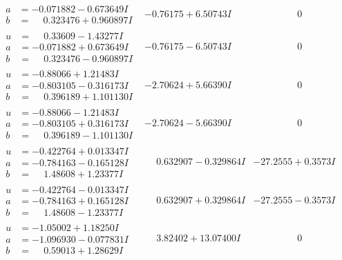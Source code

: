 \documentclass[1p]{elsarticle_modified}
\theoremstyle{definition}
\begin{document}
$$\begin{array}{c|c|c}
\begin{aligned}
a &= -0.071882 - 0.673649 I \\
b &= \phantom{-}0.323476 + 0.960897 I\end{aligned}
 & -0.76175 + 6.50743 I & \phantom{-0.000000 } 0 \\ \hline\begin{aligned}
u &= \phantom{-}0.33609 - 1.43277 I \\
a &= -0.071882 + 0.673649 I \\
b &= \phantom{-}0.323476 - 0.960897 I\end{aligned}
 & -0.76175 - 6.50743 I & \phantom{-0.000000 } 0 \\ \hline\begin{aligned}
u &= -0.88066 + 1.21483 I \\
a &= -0.803105 - 0.316173 I \\
b &= \phantom{-}0.396189 + 1.101130 I\end{aligned}
 & -2.70624 + 5.66390 I & \phantom{-0.000000 } 0 \\ \hline\begin{aligned}
u &= -0.88066 - 1.21483 I \\
a &= -0.803105 + 0.316173 I \\
b &= \phantom{-}0.396189 - 1.101130 I\end{aligned}
 & -2.70624 - 5.66390 I & \phantom{-0.000000 } 0 \\ \hline\begin{aligned}
u &= -0.422764 + 0.013347 I \\
a &= -0.784163 - 0.165128 I \\
b &= \phantom{-}1.48608 + 1.23377 I\end{aligned}
 & \phantom{-}0.632907 - 0.329864 I & -27.2555 + 0.3573 I \\ \hline\begin{aligned}
u &= -0.422764 - 0.013347 I \\
a &= -0.784163 + 0.165128 I \\
b &= \phantom{-}1.48608 - 1.23377 I\end{aligned}
 & \phantom{-}0.632907 + 0.329864 I & -27.2555 - 0.3573 I \\ \hline\begin{aligned}
u &= -1.05002 + 1.18250 I \\
a &= -1.096930 - 0.077831 I \\
b &= \phantom{-}0.59013 + 1.28629 I\end{aligned}
 & \phantom{-}3.82402 + 13.07400 I & \phantom{-0.000000 } 0 \\ \hline\begin{aligned}

\end{aligned}
\end{array}$$
\end{document}
